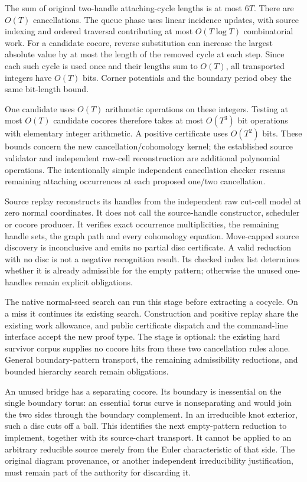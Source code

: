 The sum of original two-handle attaching-cycle lengths is at most $6T$.
There are $O(T)$ cancellations. The queue phase uses linear incidence updates,
with source indexing and ordered traversal contributing at most
$O(T\log T)$ combinatorial work. For a candidate cocore, reverse substitution
can increase the largest absolute value by at most the length of the
removed cycle at each step. Since each such cycle is used once and their
lengths sum to $O(T)$, all transported integers have $O(T)$ bits. Corner
potentials and the boundary period obey the same bit-length bound.

One candidate uses $O(T)$ arithmetic operations on these integers.
Testing at most $O(T)$ candidate cocores therefore takes at most $O(T^3)$
bit operations with elementary integer arithmetic. A positive certificate
uses $O(T^2)$ bits. These bounds concern the new cancellation/cohomology
kernel; the established source validator and independent raw-cell
reconstruction are additional polynomial operations. The intentionally
simple independent cancellation checker rescans remaining attaching
occurrences at each proposed one/two cancellation.

Source replay reconstructs its handles from the independent raw cut-cell
model at zero normal coordinates. It does not call the source-handle
constructor, scheduler or cocore producer. It verifies exact occurrence
multiplicities, the remaining handle sets, the graph path and every
cohomology equation. Move-capped source discovery is inconclusive and emits
no partial disc certificate. A valid reduction with no disc is not a negative
recognition result. Its checked index list determines whether it is already
admissible for the empty pattern; otherwise the unused one-handles remain
explicit obligations.

The native normal-seed search can run this stage before extracting a cocycle.
On a miss it continues its existing search. Construction and positive replay
share the existing work allowance, and public certificate dispatch and the
command-line interface accept the new proof type. The stage is optional:
the existing hard survivor corpus supplies no cocore hits from these two
cancellation rules alone. General boundary-pattern transport, the remaining
admissibility reductions, and bounded hierarchy search remain obligations.

An unused bridge has a separating cocore. Its boundary is inessential on the
single boundary torus: an essential torus curve is nonseparating and would
join the two sides through the boundary complement. In an irreducible knot
exterior, such a disc cuts off a ball. This identifies the next empty-pattern
reduction to implement, together with its source-chart transport. It cannot
be applied to an arbitrary reducible source merely from the Euler
characteristic of that side. The original diagram provenance, or another
independent irreducibility justification, must remain part of the authority
for discarding it.


